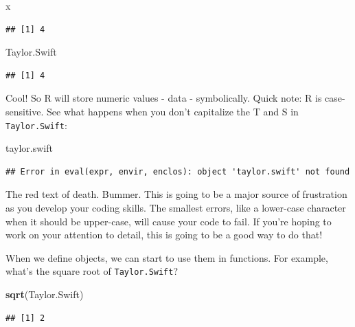 \documentclass[
]{book}
\newenvironment{Shaded}{\begin{snugshade}}{\end{snugshade}}
\newcommand{\FunctionTok}[1]{\textcolor[rgb]{0.13,0.29,0.53}{\textbf{#1}}}
\newcommand{\NormalTok}[1]{#1}
\begin{document}
\begin{Shaded}
\begin{Highlighting}[]
\NormalTok{x}
\end{Highlighting}
\end{Shaded}

\begin{verbatim}
## [1] 4
\end{verbatim}

\begin{Shaded}
\begin{Highlighting}[]
\NormalTok{Taylor.Swift}
\end{Highlighting}
\end{Shaded}

\begin{verbatim}
## [1] 4
\end{verbatim}

Cool! So R will store numeric values - data - symbolically. Quick note: R is case-sensitive. See what happens when you don't capitalize the T and S in \texttt{Taylor.Swift}:

\begin{Shaded}
\begin{Highlighting}[]
\NormalTok{taylor.swift}
\end{Highlighting}
\end{Shaded}

\begin{verbatim}
## Error in eval(expr, envir, enclos): object 'taylor.swift' not found
\end{verbatim}

The red text of death. Bummer. This is going to be a major source of frustration as you develop your coding skills. The smallest errors, like a lower-case character when it should be upper-case, will cause your code to fail. If you're hoping to work on your attention to detail, this is going to be a good way to do that!

When we define objects, we can start to use them in functions. For example, what's the square root of \texttt{Taylor.Swift}?

\begin{Shaded}
\begin{Highlighting}[]
\FunctionTok{sqrt}\NormalTok{(Taylor.Swift)}
\end{Highlighting}
\end{Shaded}

\begin{verbatim}
## [1] 2
\end{verbatim}
\end{document}
